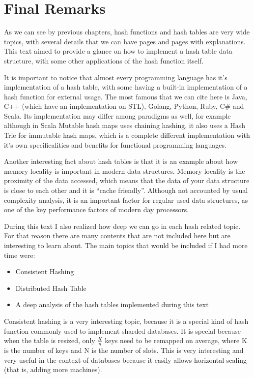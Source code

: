\chapter{Final Remarks}
\label{cap:conclusions}

As we can see by previous chapters, hash functions and hash tables are very wide topics, with several details that we can have pages and pages with explanations. This text aimed to provide a glance on how to implement a hash table data structure, with some other applications of the hash function itself.

It is important to notice that almost every programming language has it's implementation of a hash table, with some having a built-in implementation of a hash function for external usage. The most famous that we can cite here is Java, C++ (which have an implementation on STL), Golang, Python, Ruby, C\# and Scala. Its implementation may differ among paradigms as well, for example although in Scala Mutable hash maps uses chaining hashing, it also uses a Hash Trie for immutable hash maps, which is a complete different implementation with it's own specificalities and benefits for functional programming languages. \citep{hashMapAnalysis} 

Another interesting fact about hash tables is that it is an example about how memory locality is important in modern data structures. Memory locality is the proximity of the data accessed, which means that the data of your data structure is close to each other and it is ``cache friendly''. Although not accounted by usual complexity analysis, it is an important factor for regular used data structures, as one of the key performance factors of modern day processors.

During this text I also realized how deep we can go in each hash related topic. For that reason there are many contents that are not included here but are interesting to learn about. The main topics that would be included if I had more time were:

\begin{itemize}
\item Consistent Hashing
\item Distributed Hash Table
\item A deep analysis of the hash tables implemented during this text
\end{itemize}

Consistent hashing is a very interesting topic, because it is a special kind of hash function commonly used to implement sharded databases. It is special because when the table is resized, only \( \frac{K}{n} \) keys need to be remapped on average, where K is the number of keys and N is the number of slots.\citep{wikiConsistent} This is very interesting and very useful in the context of databases because it easily allows horizontal scaling (that is, adding more machines).

